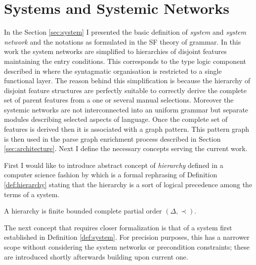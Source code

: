 \section{Systems and Systemic Networks}
\label{sec:system-networks-cs}
In the Section \ref{sec:system} I presented the basic definition of \textit{system} and \textit{system network} and the notations as formulated in the SF theory of grammar. In this work the system networks are simplified to hierarchies of disjoint features maintaining the entry conditions. This corresponds to the type logic component  described in \citep{ODonnell1993} where the syntagmatic organisation is restricted to a single functional layer. The reason behind this simplification is because the hierarchy of disjoint feature structures are perfectly suitable to correctly derive the complete set of parent features from a one or several manual selections. Moreover the systemic networks are not interconnected into an uniform grammar but separate modules describing selected aspects of language. Once the complete set of features is derived then it is associated with a graph pattern. This pattern graph is then used in the parse graph enrichment process described in Section \ref{sec:architecture}. Next I define the necessary concepts serving the current work.  

First I would like to introduce abstract concept of \textit{hierarchy} defined in a computer science fashion by \citet[30]{Pollard1987}  which is a formal rephrasing of Definition \ref{def:hierarchy} stating that the hierarchy is a sort of logical precedence among the terms of a system. 

\begin{definition}[Hierarchy]\label{def:hierarchy-cs}
	A hierarchy is finite bounded complete partial order $(\varDelta,\prec)$. 
\end{definition}

The next concept that requires closer formalization is that of a system first established in Definition \ref{def:system}. For precision purposes, this has a narrower scope without considering the system networks or precondition constraints; these are introduced shortly afterwards building upon current one.

